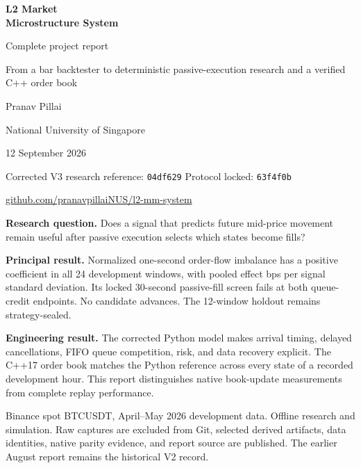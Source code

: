 \documentclass[11pt]{article}
\newcommand{\code}[1]{\nolinkurl{#1}}
\newcommand{\repo}{\href{https://github.com/pranavpillaiNUS/l2-mm-system}{github.com/pranavpillaiNUS/l2-mm-system}}
\newcommand{\ResearchCommit}{\code{04df629}}
\newcommand{\ProtocolCommit}{\code{63f4f0b}}
\newcommand{\ReportDate}{12 September 2026}
\begin{document}
\hypersetup{pageanchor=false}
\begin{titlepage}
\thispagestyle{empty}
\vspace*{0.8cm}
\noindent{\color{Navy}\rule{\textwidth}{1.8pt}}
\vspace{0.8cm}
{\Huge\bfseries L2 Market\\[0.2em]Microstructure System\par}
\vspace{0.6cm}
{\Large Complete project report\par}
\vspace{0.3cm}
{\large From a bar backtester to deterministic passive-execution research
and a verified C++ order book\par}
\vspace{1cm}
{\large Pranav Pillai\par}
{\normalsize National University of Singapore\par}
\vspace{0.25cm}
{\normalsize\ReportDate\par}
{\small Corrected V3 research reference: \ResearchCommit\quad
Protocol locked: \ProtocolCommit\par}
\vspace{0.2cm}
{\small\repo\par}
\vspace{0.7cm}
\begin{finding}
\textbf{Research question.} Does a signal that predicts future mid-price
movement remain useful after passive execution selects which states become
fills?
\end{finding}
\vspace{0.2cm}
\textbf{Principal result.} Normalized one-second order-flow imbalance has a
positive coefficient in all 24 development windows, with pooled effect
\VThreeOFIEffect{} bps per signal standard deviation. Its locked 30-second
passive-fill screen fails at both queue-credit endpoints. No candidate advances.
The 12-window holdout remains strategy-sealed.

\vspace{0.6cm}
\textbf{Engineering result.} The corrected Python model makes arrival timing,
delayed cancellations, FIFO queue competition, risk, and data recovery explicit.
The C++17 order book matches the Python reference across every state of a
recorded development hour. This report distinguishes native book-update
measurements from complete replay performance.

\vfill
{\small Binance spot BTCUSDT, April--May 2026 development data. Offline
research and simulation. Raw captures are excluded from Git, selected derived
artifacts, data identities, native parity evidence, and report source are
published. The earlier August report remains the historical V2 record.}\par
\vspace{0.4cm}
\noindent{\color{Navy}\rule{\textwidth}{1.8pt}}
\end{titlepage}
\end{document}

